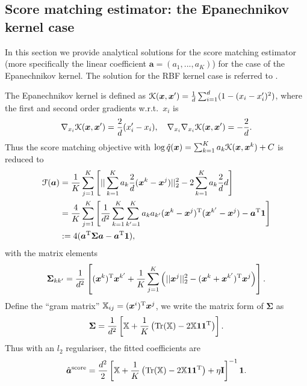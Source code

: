 \subsection{Score matching estimator: the Epanechnikov kernel case}
In this section we provide analytical solutions for the score matching estimator (more specifically the linear coefficient $\bm{a} = (a_1, ..., a_K)$) for the case of the Epanechnikov kernel. The solution for the RBF kernel case is referred to \citet{strathmann:kmc2015}.

The Epanechnikov kernel is defined as $\mathcal{K}(\bm{x}, \bm{x}') = \frac{1}{d} \sum_{i=1}^d (1 - (x_i - x'_i)^2)$, where the first and second order gradients w.r.t.~$x_i$ is
\begin{equation*}
\nabla_{x_i} \mathcal{K}(\bm{x}, \bm{x}') = \frac{2}{d}(x'_i - x_i), \quad \nabla_{x_i} \nabla_{x_i} \mathcal{K}(\bm{x}, \bm{x}') = -\frac{2}{d}.
\end{equation*}
Thus the score matching objective with $\log \hat{q}(\bm{x}) = \sum_{k=1}^K a_k \mathcal{K}(\bm{x}, \bm{x}^k) + C$ is reduced to
\begin{equation*}
\begin{aligned}
\mathcal{F}(\bm{a}) &= \frac{1}{K} \sum_{j=1}^K \left[ ||\sum_{k=1}^K a_k \frac{2}{d}(\bm{x}^k - \bm{x}^j) ||_2^2 - 2 \sum_{k=1}^K a_k \frac{2}{d} d \right] \\
&= \frac{4}{K} \sum_{j=1}^K \left[ \frac{1}{d^2} \sum_{k=1}^K \sum_{k'=1}^K a_k a_{k'} (\bm{x}^k - \bm{x}^j)^{\text{T}}(\bm{x}^{k'} - \bm{x}^j) - \bm{a}^{\text{T}} \bm{1} \right] \\
&:= 4 (\bm{a}^{\text{T}} \bm{\Sigma} \bm{a} - \bm{a}^{\text{T}} \bm{1}),
\end{aligned}
\end{equation*}
with the matrix elements
$$\bm{\Sigma}_{kk'} = \frac{1}{d^2} \left[ (\bm{x}^{k})^{\text{T}} \bm{x}^{k'} + \frac{1}{K} \sum_{j=1}^K \left( || \bm{x}^j ||_2^2 - (\bm{x}^k + \bm{x}^{k'})^{\text{T}} \bm{x}^j \right) \right]. $$
Define the ``gram matrix'' $\mathbb{X}_{ij} = (\bm{x}^i)^{\text{T}} \bm{x}^j$, we write the matrix form of $\bm{\Sigma}$ as
$$\bm{\Sigma} = \frac{1}{d^2} \left[ \mathbb{X} + \frac{1}{K} \left( \text{Tr}(\mathbb{X}) - 2 \mathbb{X} \bm{1} \bm{1}^{\text{T}} \right) \right].$$
Thus with an $l_2$ regulariser, the fitted coefficients are
$$ \hat{\bm{a}}^{\text{score}} = \frac{d^2}{2} \left[ \mathbb{X} + \frac{1}{K} \left( \text{Tr}(\mathbb{X}) - 2 \mathbb{X} \bm{1} \bm{1}^{\text{T}} \right) + \eta \mathbf{I} \right]^{-1} \bm{1}.$$

